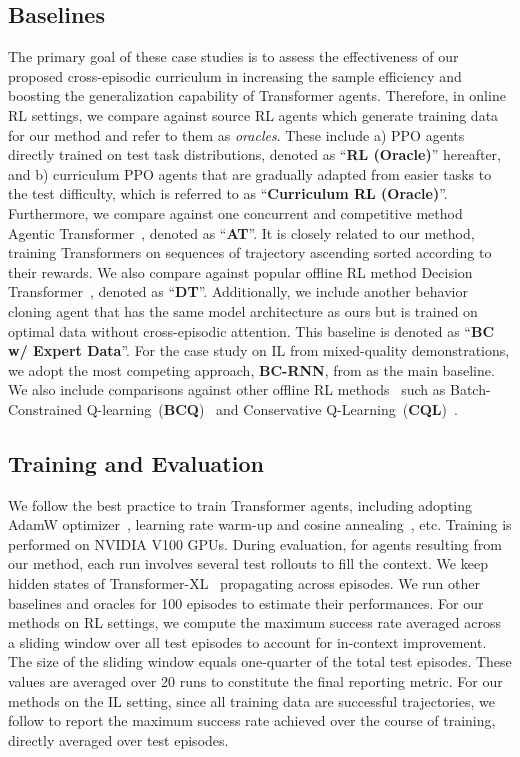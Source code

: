 \documentclass{article}
\begin{document}
\subsection{Baselines}
The primary goal of these case studies is to assess the effectiveness of our proposed cross-episodic curriculum in increasing the sample efficiency and boosting the generalization capability of Transformer agents. Therefore, in online RL settings, we compare against source RL agents which generate training data for our method and refer to them as \textit{oracles}. These include a) PPO agents directly trained on test task distributions, denoted as ``\textbf{RL (Oracle)}'' hereafter, and b) curriculum PPO agents that are gradually adapted from easier tasks to the test difficulty, which is referred to as ``\textbf{Curriculum RL (Oracle)}''.
Furthermore, we compare against one concurrent and competitive method Agentic Transformer~\citep{liu2023emergent}, denoted as ``\textbf{AT}''. It is closely related to our method, training Transformers on sequences of trajectory ascending sorted according to their rewards.
We also compare against popular offline RL method Decision Transformer~\citep{chen2021decisiontransformer}, denoted as ``\textbf{DT}''.
Additionally, we include another behavior cloning agent that has the same model architecture as ours but is trained on optimal data without cross-episodic attention.
This baseline is denoted as ``\textbf{BC w/ Expert Data}''.
For the case study on IL from mixed-quality demonstrations, we adopt the most competing approach, \textbf{BC-RNN}, from \citet{mandlekar2021matters} as the main baseline. We also include comparisons against other offline RL methods~\citep{levine2020offline} such as Batch-Constrained Q-learning~(\textbf{BCQ})~\citep{fujimoto2018offpolicy} and Conservative Q-Learning~(\textbf{CQL})~\citep{kumar2020conservative}.
\subsection{Training and Evaluation}
We follow the best practice to train Transformer agents, including adopting AdamW optimizer~\citep{loshchilov2019decoupled}, learning rate warm-up and cosine annealing~\citep{loshchilov17cosinelr}, etc.
Training is performed on NVIDIA V100 GPUs.
During evaluation, for agents resulting from our method, each run involves several test rollouts to fill the context. We keep hidden states of Transformer-XL~\citep{dai2019transformerxl} propagating across episodes.
We run other baselines and oracles for 100 episodes to estimate their performances.
For our methods on RL settings, we compute the maximum success rate averaged across a sliding window over all test episodes to account for in-context improvement.
The size of the sliding window equals one-quarter of the total test episodes.
These values are averaged over 20 runs to constitute the final reporting metric.
For our methods on the IL setting, since all training data are successful trajectories, we follow \citet{mandlekar2021matters} to report the maximum success rate achieved over the course of training, directly averaged over test episodes.
\end{document}
